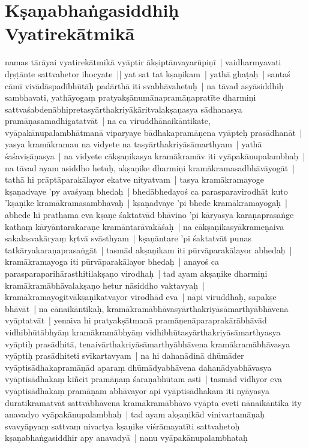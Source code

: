 \documentclass[article,12pt,a4paper]{memoir}
\begin{document}
	
	  
	
\section[{Kṣaṇabhaṅgasiddhiḥ Vyatirekātmikā}]{Kṣaṇabhaṅgasiddhiḥ Vyatirekātmikā}\label{Kṣaṇabhaṅgasiddhiḥ_Vyatirekātmikā}

	  \pstart namas tārāyai \label{thakur75-83.6} vyatirekātmikā vyāptir ākṣiptānvayarūpiṇī | vaidharmyavati dṛṣṭānte sattvahetor ihocyate || \label{thakur75-83.8} yat sat tat kṣaṇikam | yathā ghaṭaḥ | santaś cāmī vivādāspadībhūtāḥ padārthā iti svabhāvahetuḥ | \label{thakur75-83.10} na tāvad asyāsiddhiḥ sambhavati, yathāyogaṃ pratyakṣānumānapramāṇapratīte dharmiṇi sattvaśabdenābhipretasyārthakriyākāritvalakṣaṇasya sādhanasya pramāṇasamadhigatatvāt | \label{thakur75-83.12} na ca viruddhānaikāntikate, vyāpakānupalambhātmanā viparyaye bādhakapramāṇena vyāpteḥ prasādhanāt | \label{thakur75-83.13} yasya kramākramau na vidyete na tasyārthakriyāsāmarthyam | yathā śaśaviṣāṇasya | na vidyete cākṣaṇikasya kramākramāv iti vyāpakānupalambhaḥ | \label{thakur75-83.14} na tāvad ayam asiddho hetuḥ, akṣaṇike dharmiṇi kramākramasadbhāvāyogāt | tathā hi prāptāparakālayor ekatve nityatvam | tasya kramākramayoge kṣaṇadvaye 'py avaśyaṃ bhedaḥ | bhedābhedayoś ca parasparavirodhāt kuto 'kṣaṇike kramākramasambhavaḥ | kṣaṇadvaye 'pi bhede kramākramayogaḥ | abhede hi prathama eva kṣaṇe śaktatvād bhāvino 'pi kāryasya karaṇaprasaṅge kathaṃ kāryāntarakaraṇe kramāntarāvakāśaḥ | na cākṣaṇikasyākrameṇaiva sakalasvakāryaṃ kṛtvā svāsthyam | kṣaṇāntare 'pi śaktatvāt punas tatkāryakaraṇaprasaṅgāt | \label{thakur75-83.21} tasmād akṣaṇikam iti pūrvāparakālayor abhedaḥ | kramākramayoga iti pūrvāparakālayor bhedaḥ | anayoś ca parasparaparihārasthitilakṣaṇo virodhaḥ | \label{thakur75-83.23} tad ayam akṣaṇike dharmiṇi kramākramābhāvalakṣaṇo hetur nāsiddho vaktavyaḥ | kramākramayogitvākṣaṇikatvayor virodhād eva | \label{thakur75-84.1} nāpi viruddhaḥ, sapakṣe bhāvāt | \label{thakur75-84.2} na cānaikāntikaḥ, kramākramābhāvasyārthakriyāsāmarthyābhāvena vyāptatvāt | \label{thakur75-84.3} yenaiva hi pratyakṣātmanā pramāṇenāparaprakārābhāvād vidhibhūtābhyāṃ kramākramābhyāṃ vidhibhūtasyārthakriyāsāmarthyasya vyāptiḥ prasādhitā, tenaivārthakriyāsāmarthyābhāvena kramākramābhāvasya vyāptiḥ prasādhiteti svīkartavyam | na hi dahanādinā dhūmāder vyāptisādhakapramāṇād aparaṃ dhūmādyabhāvena dahanādyabhāvasya vyāptisādhakaṃ kiñcit pramāṇaṃ śaraṇabhūtam asti | tasmād vidhyor eva vyāptisādhakaṃ pramāṇam abhāvayor api vyāptisādhakam iti nyāyasya duratikramatvāt sattvābhāvena kramākramābhāvo vyāpta eveti nānaikāntika ity anavadyo vyāpakānupalambhaḥ | tad ayam akṣaṇikād vinivartamāṇaḥ svavyāpyaṃ sattvaṃ nivartya kṣaṇike viśrāmayatīti sattvahetoḥ kṣaṇabhaṅgasiddhir apy anavadyā | \label{thakur75-85.1} nanu vyāpakānupalambhataḥ 
\end{document}
